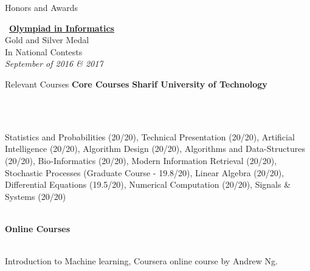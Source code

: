 \documentclass{resume} %
\begin{document}
\begin{rSection}{Honors and Awards}
\begin{footnotesize}
\begin{minipage}[t]{1.8in}
\begin{center}
\vspace{0.2cm}
\faLink \ {\bf \href{https://ioinformatics.org/journal/v11si_2017_25_33.pdf}{\underline{Olympiad in Informatics}}} \\
Gold and Silver Medal\\
In National Contests\\
\textcolor{Black!70}{\it September of 2016 \& 2017}
\end{center}
\end{minipage}
\end{footnotesize}
\end{rSection}
\begin{rSection}{Relevant Courses}
{\bf Core Courses} \hfill \textcolor{Black!70}{\bf Sharif University of Technology}
\vspace{0.15cm}
\begin{small}
\\ ‌\hspace{0.7cm} \parbox{17cm}{Statistics and Probabilities (20/20), Technical Presentation (20/20), Artificial Intelligence (20/20), Algorithm Design (20/20), Algorithms and Data-Structures (20/20), Bio-Informatics (20/20), Modern Information Retrieval (20/20), Stochastic Processes (Graduate Course - 19.8/20), Linear Algebra (20/20), Differential Equations (19.5/20), Numerical Computation (20/20), Signals \& Systems (20/20)}
\end{small}
\\ {\bf Online Courses}
\begin{small}
\\ ‌\hspace{0.7cm} Introduction to Machine learning, Coursera online course by Andrew Ng.
\end{small}
\end{rSection}
\end{document}
